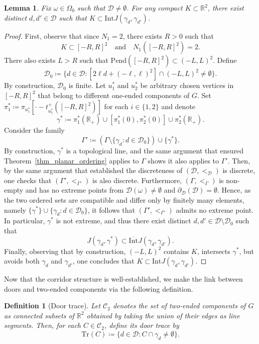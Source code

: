\documentclass[a4paper, 11pt]{article} %
\theoremstyle{plain}
\newtheorem{lemma}[theorem]{Lemma}
\newtheorem{definition}[theorem]{Definition}
\newcommand{\backward}{\mathrm{Pend}}
\newcommand{\trace}{\mathrm{Tr}}
\newcommand{\Int}{\mathrm{Int}}
\newcommand{\clInt}{\overline{\mathrm{Int}}}
\newcommand{\D}{\mathcal D}
\newcommand{\R}{\mathbb{R}}
\newcommand{\1}{\mathds 1}
\numberwithin{equation}{section}
\begin{document}
\begin{lemma}
    \label{lemma_compact}
    Fix $\omega\in\Omega_0$ such that $\D\neq\emptyset$. For any compact $K\subset\R^2$, there exist distinct $d,d'\in\D$ such that $K\subset\Int J(\gamma_d,\gamma_{d'})$.
\end{lemma}

\begin{proof}
    First, observe that since $N_1=2$, there exists $R>0$ such that
        \[K\subset[-R,R]^2\quad\text{and}\quad N_1([-R,R]^2)=2.\]
    There also exists $L>R$ such that $\backward([-R,R]^2)\subset(-L,L)^2$. Define
        \[\D_0\coloneqq\{d\in\D:[2\ell d+(-\ell,\ell)^2]\cap(-L,L)^2\neq\emptyset\}.\]
    By construction, $\D_0$ is finite. Let $u_1^*$ and $u_2^*$ be arbitrary chosen vertices in $[-R,R]^2$ that belong to different one-ended components of $G$. Set $\pi_1^*\coloneq\pi_{u_1^*}[\cdot-t_{u_1^*}^+([-R,R]^2)]$ for each $i\in\{1,2\}$ and denote
        \[\gamma^*\coloneqq \pi_1^*(\R_+)\cup[\pi_1^*(0),\pi_2^*(0)]\cup\pi_2^*(\R_+).\]
    Consider the family
        \[\Gamma'\coloneqq(\Gamma\setminus\{\gamma_d:d\in\D_0\})\cup\{\gamma^*\}.\]
    By construction, $\gamma^*$ is a topological line, and the same argument that ensured Theorem~\ref{thm_planar_ordering} applies to $\Gamma$ shows it also applies to $\Gamma'$. Then, by the same argument that established the discreteness of $(\D,<_\D)$ is discrete, one checks that $(\Gamma',<_{\Gamma'})$ is also discrete. Furthermore, $(\Gamma,<_{\Gamma})$ is non-empty and has no extreme points from $\D(\omega)\neq\emptyset$ and $\partial_\D(\D)=\emptyset$. Hence, as the two ordered sets are compatible and differ only by finitely many elements, namely $\{\gamma^*\}\cup\{\gamma_d:d\in\D_0\}$, it follows that $(\Gamma',<_{\Gamma'})$ admits no extreme point. In particular, $\gamma^*$ is not extreme, and thus there exist distinct $d,d'\in\D\setminus\D_0$ such that
        \[J(\gamma_d,\gamma^*)\subset\clInt J(\gamma_d,\gamma_{d'}).\]
    Finally, observing that by construction, $(-L,L)^2$ contains $K$, intersects $\gamma^*$, but avoids both $\gamma_d$ and $\gamma_{d'}$, one concludes that $K\subset\Int J(\gamma_d,\gamma_{d'})$.
\end{proof}


Now that the corridor structure is well-established, we make the link between doors and two-ended components via the following definition.


\begin{definition}[Door trace]
    Let $\mathcal C_2$ denotes the set of two-ended components of $G$ as connected subsets of $\R^2$ obtained by taking the union of their edges as line segments. Then, for each $C\in\mathcal C_2$, define its \emph{door trace} by
        \[\trace(C)\coloneqq\{d\in\D:C\cap\gamma_d\neq\emptyset\}.\]
\end{definition}
\end{document}
